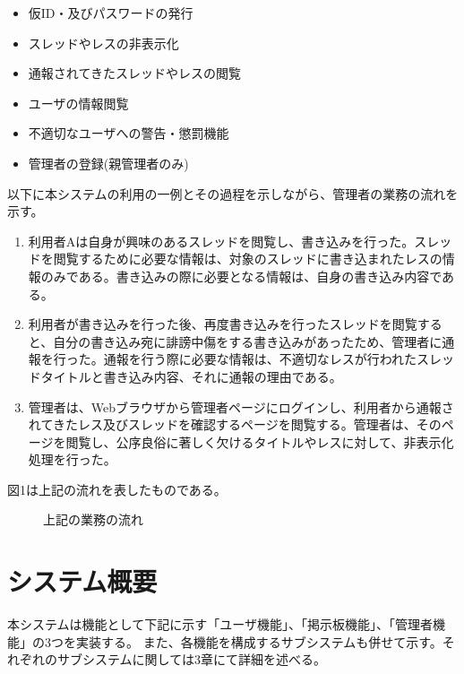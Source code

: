 \documentclass[a4j]{jarticle}
\begin{document}
\begin{itemize}
  \item 仮ID・及びパスワードの発行
  \item スレッドやレスの非表示化
  \item 通報されてきたスレッドやレスの閲覧
  \item ユーザの情報閲覧
  \item 不適切なユーザへの警告・懲罰機能
  \item 管理者の登録(親管理者のみ)
\end{itemize}





以下に本システムの利用の一例とその過程を示しながら、管理者の業務の流れを示す。

\begin{enumerate}
  \item 利用者Aは自身が興味のあるスレッドを閲覧し、書き込みを行った。スレッドを閲覧するために必要な情報は、対象のスレッドに書き込まれたレスの情報のみである。書き込みの際に必要となる情報は、自身の書き込み内容である。

  \item  利用者が書き込みを行った後、再度書き込みを行ったスレッドを閲覧すると、自分の書き込み宛に誹謗中傷をする書き込みがあったため、管理者に通報を行った。通報を行う際に必要な情報は、不適切なレスが行われたスレッドタイトルと書き込み内容、それに通報の理由である。
  \item  管理者は、Webブラウザから管理者ページにログインし、利用者から通報されてきたレス及びスレッドを確認するページを閲覧する。管理者は、そのページを閲覧し、公序良俗に著しく欠けるタイトルやレスに対して、非表示化処理を行った。
\end{enumerate}

図1は上記の流れを表したものである。


\begin{figure}[h!]
\begin{center}
\caption{上記の業務の流れ}
\label{fig:figuretest}
\end{center}
\end{figure}














\section{システム概要}
本システムは機能として下記に示す「ユーザ機能」、「掲示板機能」、「管理者機能」の3つを実装する。
 また、各機能を構成するサブシステムも併せて示す。それぞれのサブシステムに関しては3章にて詳細を述べる。
\end{document}
